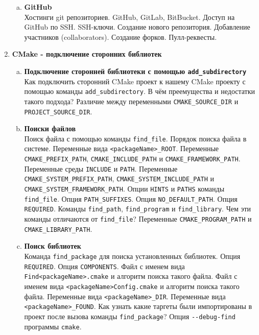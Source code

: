 \documentclass{article}
\begin{document}
\begin{enumerate}
\begin{enumerate}[a.]
\item \textbf{GitHub}\\
Хостинги git репозиториев. GitHub, GitLab, BitBucket. Доступ на GitHub по SSH. SSH-ключи.
Создание нового репозитория.
Добавление участников (collaborators).
Создание форков.
Пулл-реквесты.
\end{enumerate}


\newpage
\item \textbf{CMake - подключение сторонних библиотек}

\begin{enumerate}[a.]

\item \textbf{Подключение сторонней библиотеки с помощью \texttt{add\_subdirectory}}\\
Как подключить сторонний CMake проект к нашему CMake проекту с помощью команды \texttt{add\_subdirectory}.
В чём преемущества и недостатки такого подхода?
Различие между переменными \texttt{CMAKE\_SOURCE\_DIR} и \texttt{PROJECT\_SOURCE\_DIR}.

\item \textbf{Поиски файлов}\\
Поиск файла с помощью команды \texttt{find\_file}. Порядок поиска файла в системе.
Переменные вида \texttt{<packageName>\_ROOT}.
Переменные \texttt{CMAKE\_PREFIX\_PATH}, \texttt{CMAKE\_INCLUDE\_PATH} и \texttt{CMAKE\_FRAMEWORK\_PATH}.
Переменные среды \texttt{INCLUDE} и \texttt{PATH}.
Переменные \texttt{CMAKE\_SYSTEM\_PREFIX\_PATH}, \texttt{CMAKE\_SYSTEM\_INCLUDE\_PATH} и \texttt{CMAKE\_SYSTEM\_FRAMEWORK\_PATH}.
Опции \texttt{HINTS} и \texttt{PATHS} команды \texttt{find\_file}. Опция \texttt{PATH\_SUFFIXES}.
Опция \texttt{NO\_DEFAULT\_PATH}. Опция \texttt{REQUIRED}.
Команды \texttt{find\_path}, \texttt{find\_program} и \texttt{find\_library}. Чем эти команды отличаются от \texttt{find\_file}?
Переменные \texttt{CMAKE\_PROGRAM\_PATH} и \texttt{CMAKE\_LIBRARY\_PATH}.

\item \textbf{Поиск библиотек}\\
Команда \texttt{find\_package} для поиска установленных библиотек. Опция \texttt{REQUIRED}. Опция \texttt{COMPONENTS}.
Файл с именем вида \texttt{Find<packageName>.cmake} и алгоритм поиска такого файла.
Файл с именем вида \texttt{<packageName>Config.cmake} и алгоритм поиска такого файла.
Переменные вида \texttt{<packageName>\_DIR}.
Переменные вида \texttt{<packageName>\_FOUND}.  
Как узнать какие таргеты были импортированы в проект после вызова команды \texttt{find\_package}?
Опция \texttt{-{}-debug-find} программы \texttt{cmake}.


\end{enumerate}
\end{enumerate}
\end{document}
